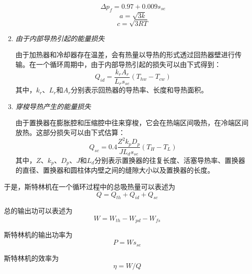 \begin{enumerate}[label=(\arabic*)]
\begin{equation}
	\Delta p_f = 0.97+0.009s_{se}
\end{equation}
\begin{equation}
	a = \sqrt{3k}
\end{equation}
\begin{equation}
	c = \sqrt{3RT}
\end{equation}

\item \emph{由于内部导热引起的能量损失}

由于加热器和冷却器存在温差，会有热量以导热的形式透过回热器壁进行传输\cite{Strauss2010}。在一个循环周期中，由于内部导热引起的损失可以由下式得到：
\begin{equation}
	Q_{id} = \frac{k_rA_r}{L_rs_{se}}(T_{hw} - T_{cw})
\end{equation}
其中，$k_r$、$L_r$和$A_r$分别表示回热器的导热率、长度和导热面积。

\item \emph{穿梭导热产生的能量损失}

由于置换器在膨胀腔和压缩腔中往来穿梭，它会在热端区间吸热，在冷端区间放热。这部分损失可以由下式估算\cite{Timoumi2008}：
\begin{equation}
	Q_{sc} = 0.4\frac{Z^2k_pD_p}{JL_ds_{se}}(T_{H} - T_{L})
\end{equation}
其中，$Z$、$k_p$、$D_p$、$J$和$L_d$分别表示置换器的往复长度、活塞导热率、置换器的直径、置换器和圆柱体内壁之间的缝隙大小以及置换器的长度。

\end{enumerate}

于是，斯特林机在一个循环过程中的总吸热量可以表述为
\begin{equation}
	Q = Q_{th} + Q_{id} + Q_{sc}
	\label{eq:heat}
\end{equation}

总的输出功可以表述为
\begin{equation}
	W = W_{th} - W_{pd} - W_{fs}
	\label{eq:work}
\end{equation}

斯特林机的输出功率为
\begin{equation}
	P = Ws_{se}
	\label{eq:P}
\end{equation}

斯特林机的效率为
\begin{equation}
	\eta = W/Q
	\label{eq:eta}
\end{equation}

